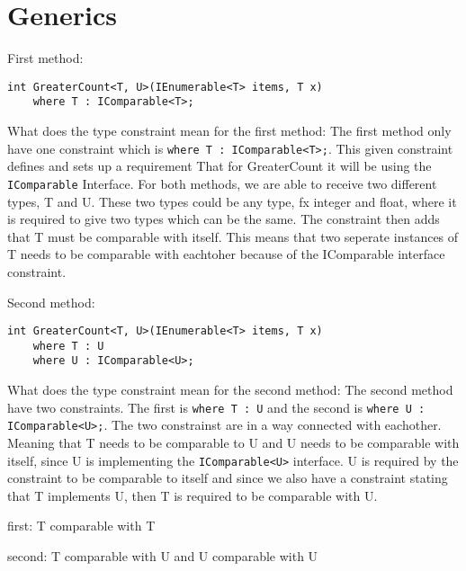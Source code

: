 \section{Generics}

First method:
\begin{lstlisting}
int GreaterCount<T, U>(IEnumerable<T> items, T x)
    where T : IComparable<T>;
\end{lstlisting}

What does the type constraint mean for the first method:
The first method only have one constraint which is \lstinline!where T : IComparable<T>;!.
This given constraint defines and sets up a requirement
That for GreaterCount it will be using the \lstinline!IComparable! Interface.
For both methods, we are able to receive two different types, T and U.
These two types could be any type, fx integer and float, where it is required to give two types which can be the same. 
The constraint then adds that T must be comparable with itself. 
This means that two seperate instances of T needs to be comparable with eachtoher because of the IComparable interface constraint.

Second method:
\begin{lstlisting}
int GreaterCount<T, U>(IEnumerable<T> items, T x)
    where T : U
    where U : IComparable<U>;
\end{lstlisting}

What does the type constraint mean for the second method:
The second method have two constraints. The first is \lstinline!where T : U! and the second is \lstinline!where U : IComparable<U>;!.
The two constrainst are in a way connected with eachother. Meaning that T needs to be comparable to U and U needs to 
be comparable with itself, since U is implementing the \lstinline!IComparable<U>! interface.
U is required by the constraint to be comparable to itself and since we also have a constraint stating that T implements U, then
T is required to be comparable with U.

first:
T comparable with T

second:
T comparable with U and U comparable with U